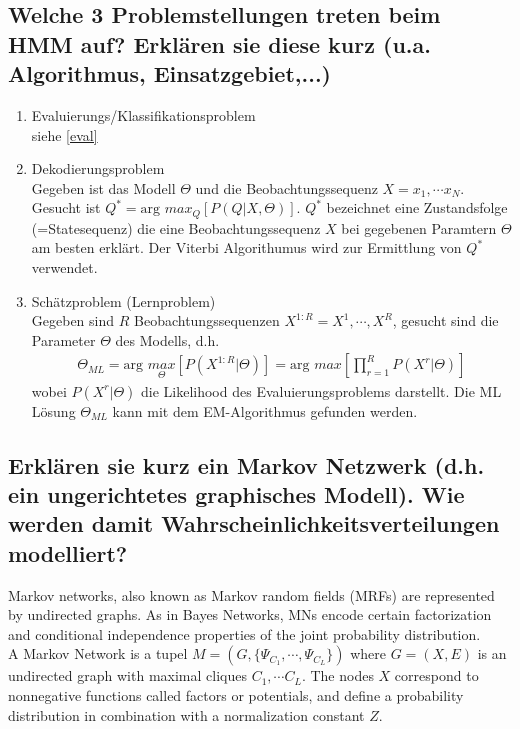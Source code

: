 \documentclass[12pt]{scrartcl}
\begin{document}
\subsection{Welche 3 Problemstellungen treten beim HMM auf? Erklären sie diese kurz (u.a. Algorithmus, Einsatzgebiet,...)}
\begin{enumerate}
\item Evaluierungs/Klassifikationsproblem \\
siehe \ref{eval} 
\item Dekodierungsproblem \\
Gegeben ist das Modell $\Theta$ und die Beobachtungssequenz $X=x_1, \cdots x_N$. Gesucht ist $Q^*=\text{arg }max_Q[P(Q|X,\Theta)]$. $Q^*$ bezeichnet eine Zustandsfolge (=Statesequenz) die eine Beobachtungssequenz $X$ bei gegebenen Paramtern $\Theta$ am besten erklärt. Der Viterbi Algorithumus wird zur Ermittlung von $Q^*$ verwendet.
\item Schätzproblem (Lernproblem) \\
Gegeben sind $R$ Beobachtungssequenzen $X^{1:R}=X^1, \cdots ,X^R$, gesucht sind die Parameter $\Theta$ des Modells, d.h.
\begin{align*}
\Theta_{ML}=\text{arg }\underset{\Theta}{max}[P(X^{1:R}|\Theta)] = \text{arg }max[\prod_{r=1}^R P(X^r|\Theta)]
\end{align*}
wobei $P(X^r|\Theta)$ die Likelihood des Evaluierungsproblems darstellt. Die ML Lösung $\Theta_{ML}$ kann mit dem EM-Algorithmus gefunden werden.
\end{enumerate}

\subsection{Erklären sie kurz ein Markov Netzwerk (d.h. ein ungerichtetes graphisches Modell). Wie werden damit Wahrscheinlichkeitsverteilungen modelliert?}
Markov networks, also known as Markov random fields (MRFs) are represented by undirected graphs. As in Bayes Networks, MNs encode certain factorization and conditional independence properties of the joint probability distribution. \\
A Markov Network is a tupel $M = (G,\{\Psi_{C_1}, \cdots ,\Psi_{C_L}\})$ where $G=(X,E)$ is an undirected graph with maximal cliques $C_1, \cdots C_L$. The nodes $X$ correspond to nonnegative functions called factors or potentials, and define a probability distribution in combination with a normalization constant $Z$.


\newpage
\pagestyle{index-style}
\tableofcontents{}
\end{document}
